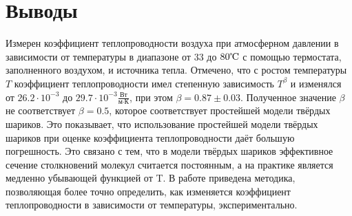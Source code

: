\chapter{Выводы}
\label{ch:conclusions}

    
    Измерен коэффициент теплопроводности воздуха при атмосферном давлении в зависимости от температуры в диапазоне от $33$ до $80 \celsius$ с помощью термостата, заполненного воздухом, и источника тепла. Отмечено, что с ростом температуры $T$ коэффициент теплопроводности имел степенную зависимость $T^{\beta}$ и изменялся от $26.2 \cdot 10^{-3}$ до $29.7 \cdot 10^{-3} \frac{\text{Вт}}{\text{м} \cdot \text{К}}$, при этом $\beta = 0.87 \pm 0.03$. Полученное значение $\beta$ не соответствует $\beta = 0.5$, которое соответствует простейшей модели твёрдых шариков. Это показывает, что использование простейшей модели твёрдых шариков при оценке коэффициента теплопроводности даёт большую погрешность. Это связано с тем, что в модели твёрдых шариков эффективное сечение столкновений молекул считается постоянным, а на практике является медленно убывающей функцией от T. В работе приведена методика, позволяющая более точно определить, как изменяется коэффициент теплопроводности в зависимости от температуры, экспериментально.